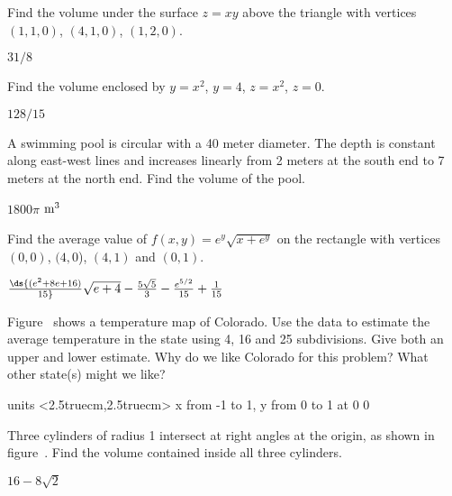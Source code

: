 \begin{exercises}
\begin{exercise} Find the volume under the surface $z=xy$ above the triangle
with vertices $(1,1,0)$, $(4,1,0)$, $(1,2,0)$.
\begin{answer} $31/8$
\end{answer}\end{exercise}

\begin{exercise} Find the volume enclosed by $y=x^2$, $y=4$, $z=x^2$, $z=0$.
\begin{answer} $128/15$
\end{answer}\end{exercise}

\begin{exercise} A swimming pool is circular with a 40 meter diameter.  The
depth is constant along east-west lines and increases linearly from 2
meters at the south end to 7 meters at the north end.  Find the volume
of the pool.  
\begin{answer} $1800\pi$ ${\rm m}^3$ 
\end{answer}\end{exercise}


\begin{exercise} Find the average value of $f(x,y)=e^y\sqrt{x+e^y}$ on the
    rectangle with vertices $(0,0)$, $(4,0$), $(4,1)$ and $(0,1)$.
\begin{answer} $\ds{(e^2+8e+16)\over15}\sqrt{e+4}-{5\sqrt5\over3}-{e^{5/2}\over15}
+{1\over15}$
\end{answer}\end{exercise}


\begin{exercise} Figure~ shows a temperature map
of Colorado.  Use the data to estimate the average temperature in the
state using 4, 16 and 25 subdivisions.  Give both an upper and lower
estimate.  Why do we like Colorado for this problem?  What other
state(s) might we like?

\figure
\vbox{\beginpicture
\setcoordinatesystem units <2.5truecm,2.5truecm>
\setplotarea x from -1 to 1, y from 0 to 1
 at 0 0
\endpicture}

\begin{exercise} Three cylinders of radius 1 intersect at right angles at the
origin, as shown in figure~. Find the
volume contained inside all three cylinders.
\begin{answer} $16-8\sqrt{2}$
\end{answer}\end{exercise}


\end{exercise}
\end{exercises}
